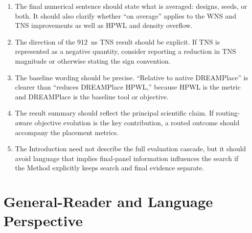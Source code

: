 \documentclass[11pt]{article}
\begin{document}
\begin{enumerate}
  \item The final numerical sentence should state what is averaged: designs,
  seeds, or both. It should also clarify whether ``on average'' applies to the
  WNS and TNS improvements as well as HPWL and density overflow.

  \item The direction of the 912~ns TNS result should be explicit. If TNS is
  represented as a negative quantity, consider reporting a reduction in TNS
  magnitude or otherwise stating the sign convention.

  \item The baseline wording should be precise. ``Relative to native
  DREAMPlace'' is clearer than ``reduces DREAMPlace HPWL,'' because HPWL is the
  metric and DREAMPlace is the baseline tool or objective.

  \item The result summary should reflect the principal scientific claim. If
  routing-aware objective evolution is the key contribution, a routed outcome
  should accompany the placement metrics.

  \item The Introduction need not describe the full evaluation cascade, but it
  should avoid language that implies final-panel information influences the
  search if the Method explicitly keeps search and final evidence separate.
\end{enumerate}

\section{General-Reader and Language Perspective}
\end{document}
